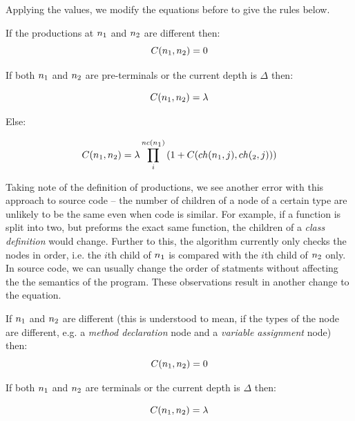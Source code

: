 Applying the values, we modify the equations before to give the rules below.

If the productions at $n\textsubscript{1}$ and $n\textsubscript{2}$ are different
then:
\begin{equation}
C(n\textsubscript{1}, n\textsubscript{2}) = 0
\end{equation}

If both $n\textsubscript{1}$ and $n\textsubscript{2}$ are pre-terminals or the
current depth is $\Delta$ then:

\begin{equation}
C(n\textsubscript{1}, n\textsubscript{2}) = \lambda
\end{equation}

Else:

\begin{equation}
C(n\textsubscript{1}, n\textsubscript{2}) = \lambda\prod_{i}^{nc(n\textsubscript{1})}
{(1+C(ch(n\textsubscript{1}, j), ch(\textsubscript{2}, j)))}
\end{equation}
\cite{ParseTreeKernel}

Taking note of the definition of productions, we see another error with this
approach to source code -- the number of children of a node of a certain type
are unlikely to be the same even when code is similar. For example, if a function
is split into two, but preforms the exact same function, the children of a
\emph{class definition} would change. Further to this, the algorithm currently
only checks the nodes in order, i.e. the $i$th child of $n\textsubscript{1}$ is
compared with the $i$th child of $n\textsubscript{2}$ only. In source code, we
can usually change the order of statments without affecting the the semantics
of the program. These observations result in another change to the equation.

If $n\textsubscript{1}$ and $n\textsubscript{2}$ are different (this is understood
to mean, if the types of the node are different, e.g. a \emph{method declaration}
node and a \emph{variable assignment} node)
then:
\begin{equation}\label{eq:parseTreeKernelBase1}
C(n\textsubscript{1}, n\textsubscript{2}) = 0
\end{equation}

If both $n\textsubscript{1}$ and $n\textsubscript{2}$ are terminals or the
current depth is $\Delta$ then:

\begin{equation}\label{eq:parseTreeKernelBase2}
C(n\textsubscript{1}, n\textsubscript{2}) = \lambda
\end{equation}

